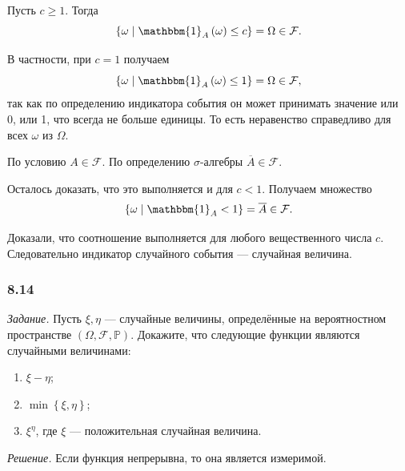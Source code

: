 Пусть $c \geq 1$.
Тогда
$$ \left\{ \omega \; \middle| \;
\mathbbm{1}_A \left( \omega \right) \leq
c \right\} =
\Omega \in
\mathcal{F}.$$

В частности, при $c = 1$ получаем
$$ \left\{ \omega \; \middle| \;
\mathbbm{1}_A \left( \omega \right) \leq
1 \right\} =
\Omega \in
\mathcal{F},$$
так как по определению индикатора события он может принимать значение или 0, или 1, что всегда не больше единицы.
То есть неравенство справедливо для всех $ \omega $ из $ \Omega $.

По условию $A \in \mathcal{F}$.
По определению $ \sigma $-алгебры $ \overline{A} \in \mathcal{F} $.

Осталось доказать, что это выполняется и для $c < 1$.
Получаем множество
$$ \left\{ \omega \; \middle| \;
\mathbbm{1}_A < 1 \right\} =
\overline{A} \in \mathcal{F}.$$

Доказали, что соотношение выполняется для любого вещественного числа $c$.
Следовательно индикатор случайного события --- случайная величина.

\subsubsection*{8.14}

\textit{Задание.} Пусть $ \xi, \eta $ --- случайные величины, определённые на вероятностном пространстве $ \left( \Omega, \mathcal{F}, \mathbb{P} \right) $.
Докажите, что следующие функции являются случайными величинами:
\begin{enumerate}[label=\alph*)]
\item $ \xi - \eta $;
\item $ \min \left\{ \xi, \eta \right\} $;
\item $ \xi^{ \eta } $, где $ \xi $ --- положительная случайная величина.
\end{enumerate}

\textit{Решение.} Если функция непрерывна, то она является измеримой.

